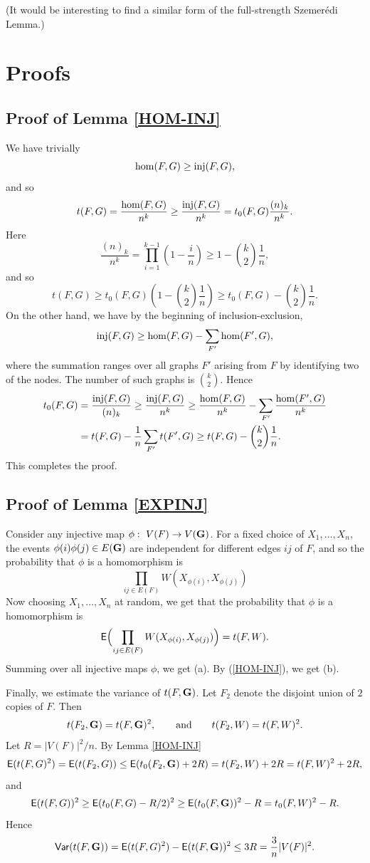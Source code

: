\documentclass[fleqn]{article}
\begin{document}
(It would be interesting to find a similar form of the full-strength
Szemer\'edi Lemma.)


\section{Proofs}\label{PROOFS}



\subsection{Proof of Lemma \ref{HOM-INJ}}
We have trivially
\[
{\rm hom}(F,G)\ge{\rm inj}(F,G),
\]
and so
\[
t(F,G)=\frac{{\rm hom}(F,G)}{n^k} \ge
\frac{{\rm inj}(F,G)}{n^k}=t_0(F,G)\frac{(n)_k}{n^k}.
\]
Here
\[
\frac{(n)_k}{n^k} = \prod_{i=1}^{k-1} \left(1-\frac{i}{n}\right)\ge
1-\binom{k}{2}\frac{1}{n},
\]
and so
\[
t(F,G) \ge t_0(F,G)\left(1-\binom{k}{2}\frac{1}{n}\right) \ge
t_0(F,G) -\binom{k}{2}\frac{1}{n}.
\]
On the other hand, we have by the beginning of inclusion-exclusion,
\[
{\rm inj}(F,G)\ge {\rm hom}(F,G)-\sum_{F'} {\rm hom}(F',G),
\]
where the summation ranges over all graphs $F'$ arising from $F$ by
identifying two of the nodes. The number of such graphs is
$\binom{k}{2}$. Hence
\begin{align*}
t_0(F,G)&=\frac{{\rm inj}(F,G)}{(n)_k} \ge \frac{{\rm inj}(F,G)}{n^k} \ge
\frac{{\rm hom}(F,G)}{n^k} - \sum_{F'} \frac{{\rm hom}(F',G)}{n^k}\\ &=
t(F,G)-\frac{1}{n}\sum_{F'} t(F',G)\ge
t(F,G)-\binom{k}{2}\frac{1}{n}.
\end{align*}
This completes the proof.

\subsection{Proof of Lemma \ref{EXPINJ}}

Consider any injective map $\phi:~V(F)\to V({\mathbf G})$. For a fixed choice
of $X_1,\dots,X_n$, the events $\phi(i)\phi(j)\in E({\mathbf G})$ are
independent for different edges $ij$ of $F$, and so the probability
that $\phi$ is a homomorphism is
\[
\prod_{ij\in E(F)} W(X_{\phi(i)},X_{\phi(j)})
\]
Now choosing $X_1,\dots,X_n$ at random, we get that the probability
that $\phi$ is a homomorphism is
\[
{\sf E}\Bigl(\prod_{ij\in E(F)} W(X_{\phi(i)},X_{\phi(j)})\Bigr)=t(F,W).
\]
Summing over all injective maps $\phi$, we get (a). By
(\ref{HOM-INJ}), we get (b).

Finally, we estimate the variance of $t(F,{\mathbf G})$. Let $F_2$ denote the
disjoint union of $2$ copies of $F$. Then
\[
t(F_2,{\mathbf G})=t(F,{\mathbf G})^2, \qquad\text{and}\qquad t(F_2,W)=t(F,W)^2.
\]
Let $R=|V(F)|^2/n$. By Lemma \ref{HOM-INJ}
\[
{\sf E}(t(F,G)^2)={\sf E}(t(F_2,G))\le {\sf E}(t_0(F_2,{\mathbf G})+
2R)=t(F_2,W)+2R=t(F,W)^2+2R,
\]
and
\[
{\sf E}(t(F,G))^2\ge {\sf E}(t_0(F,G)-R/2)^2 \ge
{\sf E}(t_0(F,{\mathbf G}))^2-R=t_0(F,W)^2-R.
\]
Hence
\[
{\sf Var}(t(F,{\mathbf G}))= {\sf E}(t(F,G)^2)-{\sf E}(t(F,{\mathbf G}))^2\le
3R=\frac{3}{n}|V(F)|^2.
\]
\end{document}
